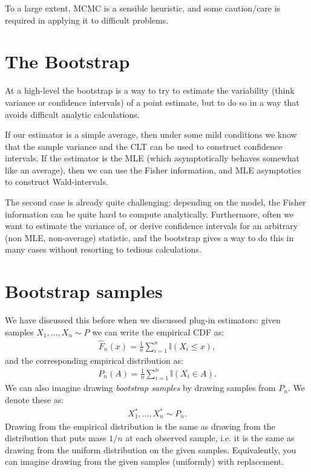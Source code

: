 \documentclass[twoside,12pt]{article}
\begin{document}
To a large extent, MCMC is a sensible heuristic, and some caution/care is required in applying it to difficult problems.

\section{The Bootstrap}
At a high-level the bootstrap is a way to try to estimate the variability (think variance or confidence intervals) of a point estimate, but to do so in a way that avoids difficult analytic calculations. 

If our estimator is a simple average, then under some mild conditions we know that the sample variance and the CLT can be used to construct confidence intervals. If the estimator is the MLE (which asymptotically behaves somewhat like an average), then we can use the Fisher information, and MLE asymptotics to construct Wald-intervals.

The second case is already quite challenging: depending on the model, the Fisher information can be quite hard to compute analytically. Furthermore, often we want to estimate the variance of, or derive confidence intervals for an arbitrary (non MLE, non-average) statistic, and the bootstrap gives a way to do this in many cases without resorting to tedious calculations.

\section{Bootstrap samples}
We have discussed this before when we discussed plug-in estimators: given samples $X_1,\ldots,X_n \sim P$ we can write the empirical CDF as:
\begin{align*}
\widehat{F}_n(x) = \frac{1}{n} \sum_{i=1}^n \mathbb{I}(X_i \leq x),
\end{align*}
and the corresponding empirical distribution as:
\begin{align*}
P_n(A) = \frac{1}{n} \sum_{i=1}^n \mathbb{I}(X_i \in A).
\end{align*}
We can also imagine drawing \emph{bootstrap samples} by drawing samples from $P_n$. We denote these as:
\begin{align*}
X_1^*,\ldots,X_n^* \sim P_n.
\end{align*}
Drawing from the empirical distribution is the same as drawing from the distribution that puts mass $1/n$ at each observed sample, i.e. it is the same as drawing from the uniform distribution on the given samples. Equivalently, you can imagine drawing from the given samples (uniformly) with replacement. 
\end{document}
